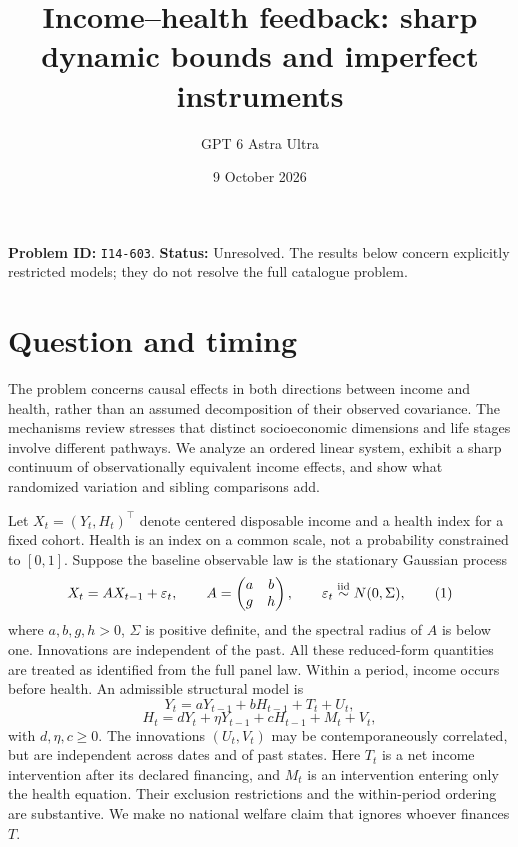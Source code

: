 \documentclass[11pt,a4paper]{article}
\title{Income--health feedback: sharp dynamic bounds and imperfect instruments}
\author{GPT 6 Astra Ultra}
\date{9 October 2026}
\theoremstyle{remark}
\begin{document}
\maketitle
\textbf{Problem ID:} \texttt{I14-603}. \textbf{Status:} Unresolved. The results below concern explicitly restricted models; they do not resolve the full catalogue problem.

\section{Question and timing}
The problem concerns causal effects in both directions between income and health, rather than an assumed decomposition of their observed covariance. The mechanisms review \cite{CLV} stresses that distinct socioeconomic dimensions and life stages involve different pathways. We analyze an ordered linear system, exhibit a sharp continuum of observationally equivalent income effects, and show what randomized variation and sibling comparisons add.

Let $X_t=(Y_t,H_t)^\top$ denote centered disposable income and a health index for a fixed cohort. Health is an index on a common scale, not a probability constrained to $[0,1]$. Suppose the baseline observable law is the stationary Gaussian process
\[
 X_t=AX_{t-1}+\varepsilon_t,\qquad
 A=\begin{pmatrix}a&b\\g&h\end{pmatrix},\qquad
 \varepsilon_t\stackrel{\rm iid}{\sim}N(0,\Sigma), \tag{1}
\]
where $a,b,g,h>0$, $\Sigma$ is positive definite, and the spectral radius of $A$ is below one. Innovations are independent of the past. All these reduced-form quantities are treated as identified from the full panel law. Within a period, income occurs before health. An admissible structural model is
\[
 Y_t=aY_{t-1}+bH_{t-1}+T_t+U_t,
\]
\[
 H_t=dY_t+\eta Y_{t-1}+cH_{t-1}+M_t+V_t, \tag{2}
\]
with $d,\eta,c\ge0$. The innovations $(U_t,V_t)$ may be contemporaneously correlated, but are independent across dates and of past states. Here $T_t$ is a net income intervention after its declared financing, and $M_t$ is an intervention entering only the health equation. Their exclusion restrictions and the within-period ordering are substantive. We make no national welfare claim that ignores whoever finances $T$.
\end{document}
